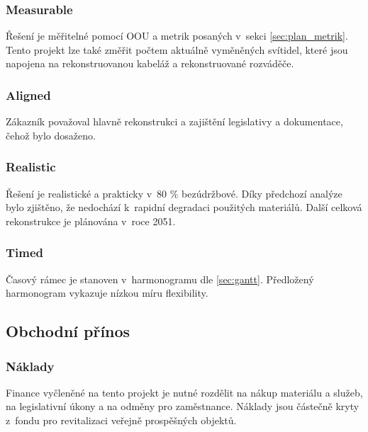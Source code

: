\documentclass[a4paper, twoside, 11pt]{article}
\begin{document}
		\subsubsection{Measurable}
			Řešení je měřitelné pomocí OOU a metrik posaných v~sekci \ref{sec:plan_metrik}. Tento projekt lze také změřit počtem aktuálně vyměněných svítidel, které jsou napojena na rekonstruovanou kabeláž a rekonstruované rozváděče.
		\subsubsection{Aligned}
			Zákazník považoval hlavně rekonstrukci a zajištění legislativy a dokumentace, čehož bylo dosaženo.
		\subsubsection{Realistic}
			Řešení je realistické a prakticky v~80 \% bezúdržbové. Díky předchozí analýze bylo zjištěno, že nedochází k~rapidní degradaci použitých materiálů. Další celková rekonstrukce je plánována v~roce 2051.
		\subsubsection{Timed}
			Časový rámec je stanoven v~harmonogramu dle \ref{sec:gantt}. Předložený harmonogram vykazuje nízkou míru flexibility.
	\subsection{Obchodní přínos}
		\subsubsection{Náklady}
			Finance vyčleněné na tento projekt je nutné rozdělit na nákup materiálu a služeb, na legislativní úkony a na odměny pro zaměstnance. Náklady jsou částečně kryty z~fondu pro revitalizaci veřejně prospěšných objektů.
			
\end{document}
